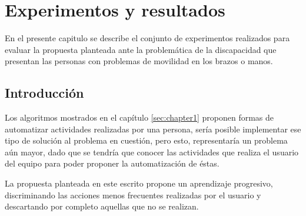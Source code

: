 \chapter{Experimentos y resultados}
\label{sec:chapter5}

En el presente capitulo se describe el conjunto de experimentos realizados
 para evaluar la propuesta planteada ante la problem\'atica de la discapacidad 
 que presentan las personas con problemas de movilidad en los brazos o manos.


\section{Introducci\'on}

Los algoritmos mostrados en el cap\'itulo \ref{sec:chapter1} proponen formas
 de automatizar actividades realizadas por una persona, ser\'ia posible 
 implementar ese tipo de soluci\'on al problema en cuesti\'on, pero esto, 
 representar\'ia un problema a\'un mayor, dado que se tendr\'ia que conocer 
 las actividades que realiza el usuario del equipo para poder proponer la 
 automatizaci\'on de \'estas. 


La propuesta planteada en este escrito propone un aprendizaje progresivo,
 discriminando las acciones menos frecuentes realizadas por el usuario y 
 descartando por completo aquellas que no se realizan.




